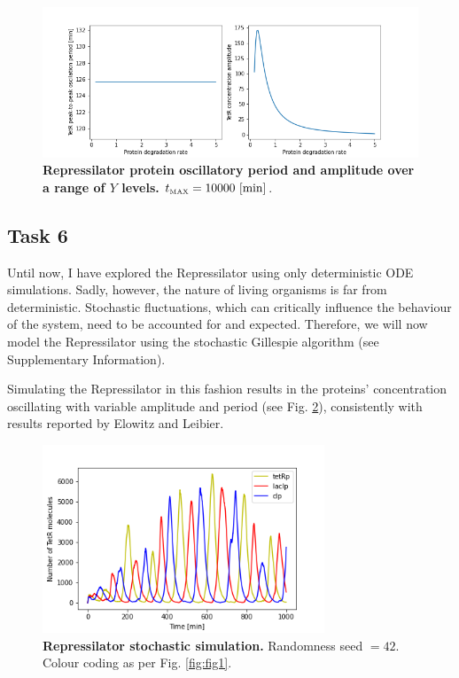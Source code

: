 \documentclass[runningheads,a4paper]{llncs}
\begin{document}
\begin{figure}
    \singlespacing
    \centering
    \includegraphics[width=1\textwidth,trim={1.5cm 0 1.5cm 0},clip]{suplementary_information_and_code/Task5_figure4.png}
    \caption{\textbf{Repressilator protein oscillatory period and amplitude over a range of $Y$ levels.} $t_{\textrm{\tiny MAX}} = 10 000\ [\textrm{min}]$.}
    \label{fig:fig16}
\end{figure}

\clearpage
\subsection*{Task 6}
Until now, I have explored the Repressilator using only deterministic ODE simulations. Sadly, however, the nature of living organisms is far from deterministic. Stochastic fluctuations, which can critically influence the behaviour of the system, need to be accounted for and expected. Therefore, we will now model the Repressilator using the stochastic Gillespie algorithm (see Supplementary Information).

Simulating the Repressilator in this fashion results in the proteins' concentration oscillating with variable amplitude and period (see Fig. \ref{fig:fig17}), consistently with results reported by Elowitz and Leibier\cite{Elowitz2000d}.

\begin{figure}
    \singlespacing
    \centering
    \includegraphics[width=0.75\textwidth]{suplementary_information_and_code/Task6_figure1.png}
    \caption{\textbf{Repressilator stochastic simulation.} Randomness seed $= 42$. Colour coding as per Fig. \ref{fig:fig1}.}
    \label{fig:fig17}
\end{figure}
\end{document}
